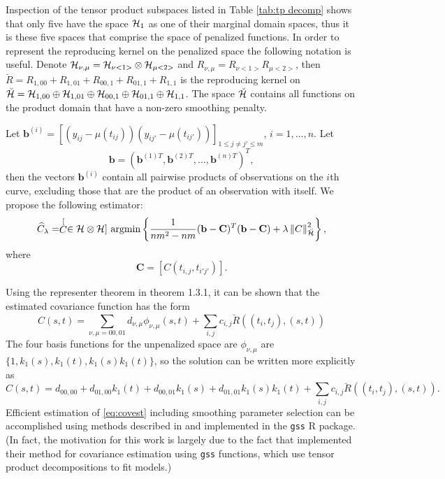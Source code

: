 Inspection of the tensor product subspaces listed in Table \ref{tab:tp decomp} shows that only five have the space $\mathcal{H}_1$ as one of their marginal domain spaces, thus it is these five spaces that comprise the space of penalized functions. In order to represent the reproducing kernel on the penalized space the following notation is useful. Denote $\mathcal{H}_{\nu, \mu}=\mathcal{H}_{\nu <1>}\otimes \mathcal{H}_{\mu <2>}$ and $R_{\nu, \mu}=R_{\nu <1>}R_{\mu <2>}$, then $\breve{R} = R_{1,00}+R_{1,01}+R_{00,1}+R_{01,1}+R_{1,1}$ is the reproducing kernel on $\breve{\mathcal{H}} =  \mathcal{H}_{1,00}\oplus\mathcal{H}_{1,01}\oplus\mathcal{H}_{00,1}\oplus\mathcal{H}_{01,1}\oplus\mathcal{H}_{1,1}$. The space $\breve{\mathcal{H}}$ contains all functions on the product domain that have a non-zero smoothing penalty.

Let $\mathbf{b}^{(i)} = [(y_{ij}-\mu(t_{ij}))(y_{ij'}-\mu(t_{ij'}))]_{1\leq j\neq j'\leq m}$, $i=1, \dots, n$. Let
\[
\mathbf{b} = (\mathbf{b}^{(1)T}, \mathbf{b}^{(2)T}, \dots, \mathbf{b}^{(n)T}   )^T,
\]
then the vectors $\mathbf{b}^{(i)}$ contain all pairwise products of observations on the $i$th curve, excluding those that are the product of an observation with itself. We propose the following estimator:
\[
\widehat{C}_{\lambda}=\stackrel[C \in \mathcal{H}\otimes \mathcal{H}]{}{\text{ argmin}} \left\{\frac{1}{nm^2-nm} (\mathbf{b} - \mathbf{C})^T(\mathbf{b} - \mathbf{C})+\lambda\left\Vert C\right\Vert _{\breve{\mathcal{H}}}^{2} \right\},
\]
 where
\[
\mathbf{C} = [C(t_{i,j}, t_{i'j'})].
\]

 
Using the representer theorem in \cite{Wahba:1990} theorem 1.3.1, it can be shown that the estimated covariance function has the form
\begin{equation}
		\hat{C}(s,t) = \sum_{\nu, \mu=00,01}d_{\nu,\mu}\phi_{\nu,\mu}(s,t) + \sum_{i,j}c_{i,j}\breve{R}((t_i,t_j),(s,t))
\end{equation}
 The four basis functions for the unpenalized space are $\phi_{\nu,\mu}$ are $\{ 1, k_1(s), k_1(t), k_1(s)k_1(t)  \}$, so the solution can be written more explicitly as 
\begin{equation}
		\hat{C}(s,t) = d_{00,00} + d_{01,00}k_1(t) + d_{00,01}k_1(s) + d_{01,01}k_1(s)k_1(t) + \sum_{i,j}c_{i,j}\breve{R}((t_i,t_j),(s,t)). 
\label{eq:covest}
\end{equation}
Efficient estimation of \eqref{eq:covest} including smoothing parameter selection can be accomplished using methods described in \cite{Gu2002} and implemented in the \texttt{gss} R package. (In fact, the motivation for this work is largely due to the fact that \cite{Cai:2010vr} implemented their method for covariance estimation using \texttt{gss} functions, which use tensor product decompositions to fit models.)


